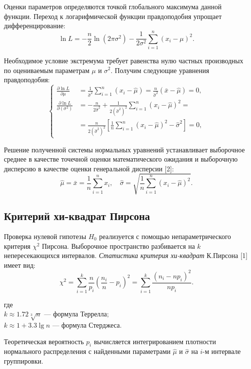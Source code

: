 \documentclass[a4paper, 14pt]{extarticle}
\begin{document}
Оценки параметров определяются точкой глобального максимума данной функции. Переход к логарифмической функции правдоподобия упрощает дифференцирование:
\begin{equation*}
    \ln L = -\frac{n}{2}\ln(2\pi\sigma^2) - \frac{1}{2\sigma^2}\sum_{i=1}^n(x_i - \mu)^2.
\end{equation*}

Необходимое условие экстремума требует равенства нулю частных производных по оцениваемым параметрам $\mu$ и $\sigma^2$. Получим следующие уравнения правдоподобия:
\begin{equation*}
\left\{
\begin{aligned}
\frac{\partial \ln L}{\partial \mu} &= \frac{1}{\widehat{\sigma}^2} \sum_{i=1}^{n} (x_i - \widehat{\mu}) = \frac{n}{\widehat{\sigma}^2} (\bar{x} - \widehat{\mu}) = 0, \\
\frac{\partial \ln L}{\partial (\sigma^2)} &= -\frac{n}{2\widehat{\sigma}^2} + \frac{1}{2(\widehat{\sigma}^2)^2} \sum_{i=1}^{n} (x_i - \widehat{\mu})^2 = \\
&= \frac{n}{2(\widehat{\sigma}^2)^2} \left[ \frac{1}{n} \sum_{i=1}^{n} (x_i - \widehat{\mu})^2 - \widehat{\sigma}^2 \right] = 0,
\end{aligned}
\right.
\end{equation*}

Решение полученной системы нормальных уравнений устанавливает выборочное среднее в качестве точечной оценки математического ожидания и выборочную дисперсию в качестве оценки генеральной дисперсии [2]:
\begin{equation*}
    \hat{\mu} = \bar{x} = \frac{1}{n}\sum_{i=1}^n x_i, \quad \hat{\sigma} = \sqrt{\frac{1}{n}\sum_{i=1}^n (x_i - \hat{\mu})^2}.
\end{equation*}

\subsection{Критерий хи-квадрат Пирсона}

Проверка нулевой гипотезы $H_0$ реализуется с помощью непараметрического критерия $\chi^2$ Пирсона. Выборочное пространство разбивается на $k$ непересекающихся интервалов. \textit{Статистика критерия хи-квадрат} К.Пирсона [1] имеет вид:
\begin{equation*}
    \chi^2 = \sum_{i=1}^{k} \frac{n}{p_i} \left( \frac{n_i}{n} - p_i \right)^2 = \sum_{i=1}^{k} \frac{(n_i - n p_i)^2}{n p_i}.
\end{equation*}
\begin{flushleft}
где \\
\quad $k \approx 1.72\sqrt[3]{n}$ — формула Террелла; \\
\quad $k \approx 1 + 3.3\lg{n}$ — формула Стерджеса.
\end{flushleft}
Теоретическая вероятность $p_i$ вычисляется интегрированием плотности нормального распределения с найденными параметрами $\hat{\mu}$ и $\hat{\sigma}$ на $i$-м интервале группировки. 
\end{document}
